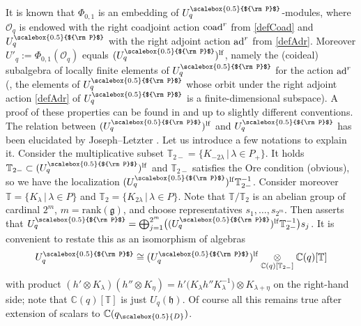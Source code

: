 \documentclass[11pt]{amsart}
\newcommand{\Oo}{\mathcal{O}}
\newcommand{\qD}{q_{\scalebox{0.5}{D}}}
\newcommand{\Pup}{{\scalebox{0.5}{${\rm P}$}}}
\begin{document}
\smallskip

\indent It is known that $\Phi_{0,1}$ is an embedding of $U_q^\Pup$-modules, where $\Oo_q$ is endowed with the right coadjoint action ${\rm coad}^r$ from \eqref{defCoad} and $U_q^\Pup$ with the right adjoint action ${\rm ad}^r$ from \eqref{defAdr}. Moreover $U'_q := \Phi_{0,1}(\Oo_q)$ equals $(U_q^\Pup)^{\rm lf}$, namely the (coideal) subalgebra of locally finite elements of $U_q^\Pup$ for the action ${\rm ad}^r$ (, the elements of $U_q^\Pup$ whose orbit under the right adjoint action \eqref{defAdr} of $U_q^\Pup$ is a  finite-dimensional subspace). A proof of these properties can be found in \cite{baumann} and \cite[Th.\,3.113 and Prop.\,3.116]{VY} up to slightly different conventions. The relation between $(U_q^\Pup)^{\mathrm{lf}}$ and $U_q^\Pup$ has been elucidated by Joseph--Letzter \cite{JL}. Let us introduce a few notations to explain it. Consider the multiplicative subset $\mathbb{T}_{2-} = \bigl\{ K_{-2\lambda} \, \big|\, \lambda \in P_+ \bigr\}$. It holds $\mathbb{T}_{2-} \subset (U_q^\Pup)^{\mathrm{lf}}$ and $\mathbb{T}_{2-}$ satisfies the Ore condition (obvious), so we have the localization $(U_q^\Pup)^{\mathrm{lf}}\mathbb{T}_{2-}^{-1}$. Consider moreover $\mathbb{T} = \bigl\{ K_\lambda \, \big|\, \lambda \in P \bigr\}$ and $\mathbb{T}_2 = \bigl\{ K_{2\lambda} \, \big|\, \lambda \in P \bigr\}$. Note that $\mathbb{T}/\mathbb{T}_2$ is an abelian group of cardinal $2^m$, $m = \mathrm{rank}(\mathfrak{g})$, and choose representatives $s_1, \ldots, s_{2^m}$. Then \cite[\S 6.4]{JL} asserts that $\textstyle U_q^\Pup = \bigoplus_{j=1}^{2^m} \bigl((U_q^\Pup)^{\mathrm{lf}}\mathbb{T}_{2-}^{-1}\bigr)s_j$. It is convenient to restate this as an isomorphism of algebras
\begin{equation}\label{relatingLfAndUq}
U_q^\Pup \cong (U_q^\Pup)^{\mathrm{lf}} \underset{\mathbb{C}(q)[\mathbb{T}_{2-}]}{\otimes} \mathbb{C}(q)[\mathbb{T}]
\end{equation}
with product $(h' \otimes K_\lambda)(h'' \otimes K_\eta) = h'\bigl( K_\lambda h''K_\lambda^{-1} \bigr) \otimes K_{\lambda + \eta}$ on the right-hand side; note that $\mathbb{C}(q)[\mathbb{T}]$ is just $U_q(\mathfrak{h})$. Of course all this remains true after extension of scalars to $\mathbb{C}(\qD)$.

\smallskip
\end{document}
